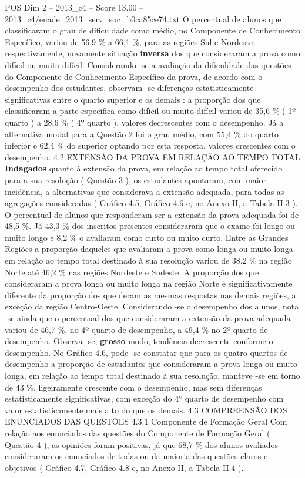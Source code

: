 \begin{textsample}{POS Dim 2 – 2013\_c4 – Score 13.00 – 2013\_c4/enade\_2013\_serv\_soc\_b0ca85ce74.txt}
O percentual de alunos que classificaram o grau de dificuldade como médio, no Componente de Conhecimento Específico, variou de 56,9 \% a 66,1 \%, para as regiões Sul e Nordeste, respectivamente, novamente situação \textbf{inversa} dos que consideraram a prova como difícil ou muito difícil.
Considerando -se a avaliação da dificuldade das questões do Componente de Conhecimento Específico da prova, de acordo com o desempenho dos estudantes, observam -se diferenças estatisticamente significativas entre o quarto superior e os demais : a proporção dos que classificaram a parte específica como difícil ou muito difícil variou de 35,6 \% ( 1º quarto ) a 28,6 \% ( 4º quarto ), valores decrescentes com o desempenho.
Já a alternativa modal para a Questão 2 foi o grau médio, com 55,4 \% do quarto inferior e 62,4 \% do superior optando por esta resposta, valores crescentes com o desempenho. 4.2 EXTENSÃO DA PROVA EM RELAÇÃO AO TEMPO TOTAL \textbf{Indagados} quanto à extensão da prova, em relação ao tempo total oferecido para a sua resolução ( Questão 3 ), os estudantes apontaram, com maior incidência, a alternativas que considerava a extensão adequada, para todas as agregações consideradas ( Gráfico 4.5, Gráfico 4.6 e, no Anexo II, a Tabela II.3 ).
O percentual de alunos que responderam ser a extensão da prova adequada foi de 48,5 \%.
Já 43,3 \% dos inscritos presentes consideraram que o exame foi longo ou muito longo e 8,2 \% o avaliaram como curto ou muito curto.
Entre as Grandes Regiões a proporção daqueles que avaliaram a prova como longa ou muito longa em relação ao tempo total destinado à sua resolução variou de 38,2 \% na região Norte até 46,2 \% nas regiões Nordeste e Sudeste.
A proporção dos que consideraram a prova longa ou muito longa na região Norte é significativamente diferente da proporção dos que deram as mesmas respostas nas demais regiões, a exceção da região Centro-Oeste.
Considerando -se o desempenho dos alunos, nota -se ainda que o percentual dos que consideraram a extensão da prova adequada variou de 46,7 \%, no 4º quarto de desempenho, a 49,4 \% no 2º quarto de desempenho.
Observa -se, \textbf{grosso} modo, tendência decrescente conforme o desempenho.
No Gráfico 4.6, pode -se constatar que para os quatro quartos de desempenho a proporção de estudantes que consideraram a prova longa ou muito longa, em relação ao tempo total destinado à sua resolução, manteve -se em torno de 43 \%, ligeiramente crescente com o desempenho, mas sem diferenças estatisticamente significativas, com exceção do 4º quarto de desempenho com valor estatisticamente mais alto do que os demais. 4.3 COMPREENSÃO DOS ENUNCIADOS DAS QUESTÕES 4.3.1 Componente de Formação Geral Com relação aos enunciados das questões do Componente de Formação Geral ( Questão 4 ), as opiniões foram positivas, já que 68,7 \% dos alunos avaliados consideraram os enunciados de todas ou da maioria das questões claros e objetivos ( Gráfico 4.7, Gráfico 4.8 e, no Anexo II, a Tabela II.4 ).

\end{textsample}
